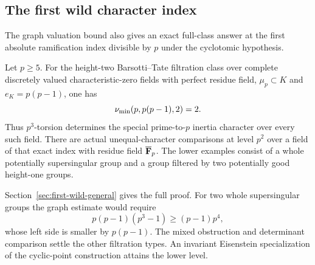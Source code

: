 \subsection{The first wild character index}
The graph valuation bound also gives an exact full-class answer at the first absolute ramification index divisible by $p$ under the cyclotomic hypothesis.

\begin{theorem}\label{thm:first-wild-general}
Let $p\ge5$. For the height-two Barsotti--Tate filtration class over complete discretely valued characteristic-zero fields with perfect residue field, $\mu_p\subset K$ and $e_K=p(p-1)$, one has
\[
                         \nu_{\min}(p,p(p-1),2)=2.
\]
Thus $p^3$-torsion determines the special prime-to-$p$ inertia character over every such field. There are actual unequal-character comparisons at level $p^2$ over a field of that exact index with residue field $\overline{\mathbf F}_p$. The lower examples consist of a whole potentially supersingular group and a group filtered by two potentially good height-one groups.
\end{theorem}

Section~\ref{sec:first-wild-general} gives the full proof. For two whole supersingular groups the graph estimate would require
\[
p(p-1)(p^3-1)\ge(p-1)p^4,
\]
whose left side is smaller by $p(p-1)$. The mixed obstruction and determinant comparison settle the other filtration types. An invariant Eisenstein specialization of the cyclic-point construction attains the lower level.
